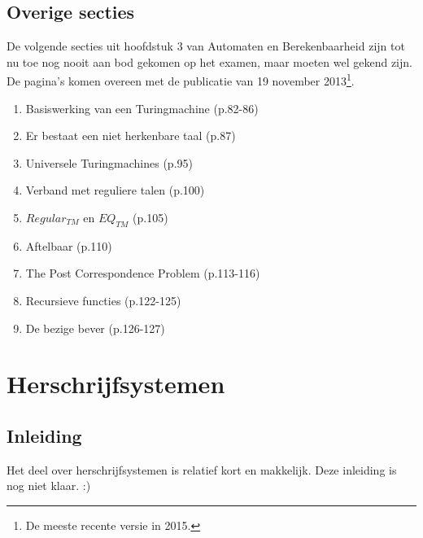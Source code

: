 \documentclass[10pt,a4paper]{article}
\begin{document}
\subsection{Overige secties}

De volgende secties uit hoofdstuk 3 van Automaten en Berekenbaarheid zijn tot nu toe nog nooit aan bod gekomen op het examen, maar moeten wel gekend zijn. De pagina's komen overeen met de publicatie van 19 november 2013\footnote{De meeste recente versie in 2015.}.
\begin{enumerate}
	\item Basiswerking van een Turingmachine (p.82-86)
	\item Er bestaat een niet herkenbare taal (p.87)
	\item Universele Turingmachines (p.95)
	\item Verband met reguliere talen (p.100)
	\item $Regular_{TM}$ en $EQ_{TM}$ (p.105)
	\item Aftelbaar (p.110)
	\item The Post Correspondence Problem (p.113-116)
	\item Recursieve functies (p.122-125)
	\item De bezige bever (p.126-127)
\end{enumerate}









\newpage
\section{Herschrijfsystemen}

\subsection{Inleiding}

Het deel over herschrijfsystemen is relatief kort en makkelijk. Deze inleiding is nog niet klaar. :)



\end{document}
